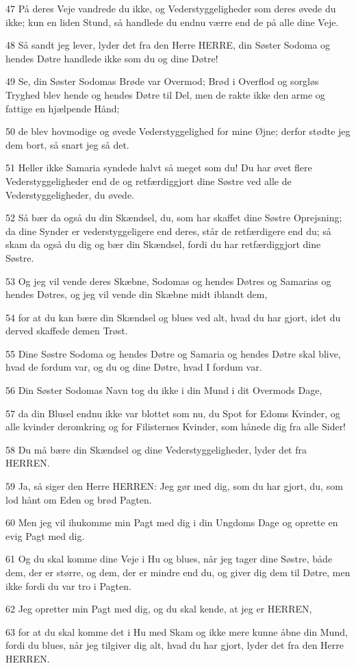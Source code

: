 \par 47 På deres Veje vandrede du ikke, og Vederstyggeligheder som deres øvede du ikke; kun en liden Stund, så handlede du endnu værre end de på alle dine Veje.
\par 48 Så sandt jeg lever, lyder det fra den Herre HERRE, din Søster Sodoma og hendes Døtre handlede ikke som du og dine Døtre!
\par 49 Se, din Søster Sodomas Brøde var Overmod; Brød i Overflod og sorgløs Tryghed blev hende og hendes Døtre til Del, men de rakte ikke den arme og fattige en hjælpende Hånd;
\par 50 de blev hovmodige og øvede Vederstyggelighed for mine Øjne; derfor stødte jeg dem bort, så snart jeg så det.
\par 51 Heller ikke Samaria syndede halvt så meget som du! Du har øvet flere Vederstyggeligheder end de og retfærdiggjort dine Søstre ved alle de Vederstyggeligheder, du øvede.
\par 52 Så bær da også du din Skændsel, du, som har skaffet dine Søstre Oprejsning; da dine Synder er vederstyggeligere end deres, står de retfærdigere end du; så skam da også du dig og bær din Skændsel, fordi du har retfærdiggjort dine Søstre.
\par 53 Og jeg vil vende deres Skæbne, Sodomas og hendes Døtres og Samarias og hendes Døtres, og jeg vil vende din Skæbne midt iblandt dem,
\par 54 for at du kan bære din Skændsel og blues ved alt, hvad du har gjort, idet du derved skaffede demen Trøst.
\par 55 Dine Søstre Sodoma og hendes Døtre og Samaria og hendes Døtre skal blive, hvad de fordum var, og du og dine Døtre, hvad I fordum var.
\par 56 Din Søster Sodomas Navn tog du ikke i din Mund i dit Overmods Dage,
\par 57 da din Blusel endnu ikke var blottet som nu, du Spot for Edoms Kvinder, og alle kvinder deromkring og for Filisternes Kvinder, som hånede dig fra alle Sider!
\par 58 Du må bære din Skændsel og dine Vederstyggeligheder, lyder det fra HERREN.
\par 59 Ja, så siger den Herre HERREN: Jeg gør med dig, som du har gjort, du, som lod hånt om Eden og brød Pagten.
\par 60 Men jeg vil ihukomme min Pagt med dig i din Ungdoms Dage og oprette en evig Pagt med dig.
\par 61 Og du skal komme dine Veje i Hu og blues, når jeg tager dine Søstre, både dem, der er større, og dem, der er mindre end du, og giver dig dem til Døtre, men ikke fordi du var tro i Pagten.
\par 62 Jeg opretter min Pagt med dig, og du skal kende, at jeg er HERREN,
\par 63 for at du skal komme det i Hu med Skam og ikke mere kunne åbne din Mund, fordi du blues, når jeg tilgiver dig alt, hvad du har gjort, lyder det fra den Herre HERREN.

